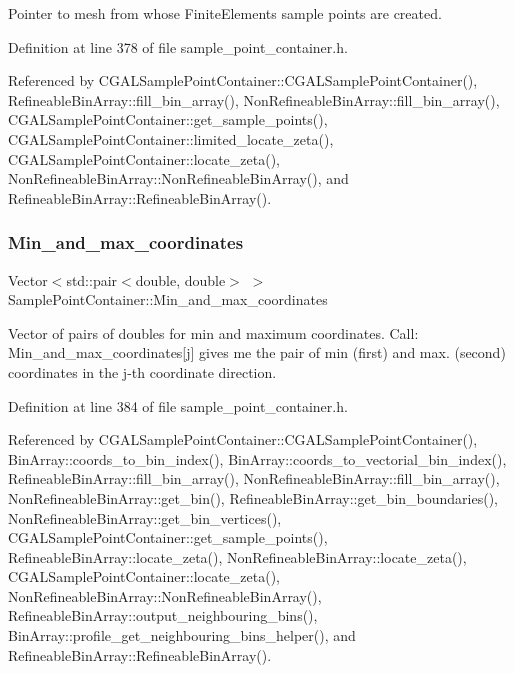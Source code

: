 Pointer to mesh from whose Finite\+Elements sample points are created. 



Definition at line 378 of file sample\+\_\+point\+\_\+container.\+h.



Referenced by C\+G\+A\+L\+Sample\+Point\+Container\+::\+C\+G\+A\+L\+Sample\+Point\+Container(), Refineable\+Bin\+Array\+::fill\+\_\+bin\+\_\+array(), Non\+Refineable\+Bin\+Array\+::fill\+\_\+bin\+\_\+array(), C\+G\+A\+L\+Sample\+Point\+Container\+::get\+\_\+sample\+\_\+points(), C\+G\+A\+L\+Sample\+Point\+Container\+::limited\+\_\+locate\+\_\+zeta(), C\+G\+A\+L\+Sample\+Point\+Container\+::locate\+\_\+zeta(), Non\+Refineable\+Bin\+Array\+::\+Non\+Refineable\+Bin\+Array(), and Refineable\+Bin\+Array\+::\+Refineable\+Bin\+Array().

\mbox{\label{classSamplePointContainer_a1607ff8abb3f3b6364bc169a6ea4a79c}} 
\subsubsection{\texorpdfstring{Min\+\_\+and\+\_\+max\+\_\+coordinates}{Min\_and\_max\_coordinates}}
{\footnotesize\ttfamily Vector$<$std\+::pair$<$double, double$>$ $>$ Sample\+Point\+Container\+::\+Min\+\_\+and\+\_\+max\+\_\+coordinates\hspace{0.3cm}{\ttfamily [protected]}}

Vector of pairs of doubles for min and maximum coordinates. Call\+: Min\+\_\+and\+\_\+max\+\_\+coordinates\mbox{[}j\mbox{]} gives me the pair of min (first) and max. (second) coordinates in the j-\/th coordinate direction. 

Definition at line 384 of file sample\+\_\+point\+\_\+container.\+h.



Referenced by C\+G\+A\+L\+Sample\+Point\+Container\+::\+C\+G\+A\+L\+Sample\+Point\+Container(), Bin\+Array\+::coords\+\_\+to\+\_\+bin\+\_\+index(), Bin\+Array\+::coords\+\_\+to\+\_\+vectorial\+\_\+bin\+\_\+index(), Refineable\+Bin\+Array\+::fill\+\_\+bin\+\_\+array(), Non\+Refineable\+Bin\+Array\+::fill\+\_\+bin\+\_\+array(), Non\+Refineable\+Bin\+Array\+::get\+\_\+bin(), Refineable\+Bin\+Array\+::get\+\_\+bin\+\_\+boundaries(), Non\+Refineable\+Bin\+Array\+::get\+\_\+bin\+\_\+vertices(), C\+G\+A\+L\+Sample\+Point\+Container\+::get\+\_\+sample\+\_\+points(), Refineable\+Bin\+Array\+::locate\+\_\+zeta(), Non\+Refineable\+Bin\+Array\+::locate\+\_\+zeta(), C\+G\+A\+L\+Sample\+Point\+Container\+::locate\+\_\+zeta(), Non\+Refineable\+Bin\+Array\+::\+Non\+Refineable\+Bin\+Array(), Refineable\+Bin\+Array\+::output\+\_\+neighbouring\+\_\+bins(), Bin\+Array\+::profile\+\_\+get\+\_\+neighbouring\+\_\+bins\+\_\+helper(), and Refineable\+Bin\+Array\+::\+Refineable\+Bin\+Array().

